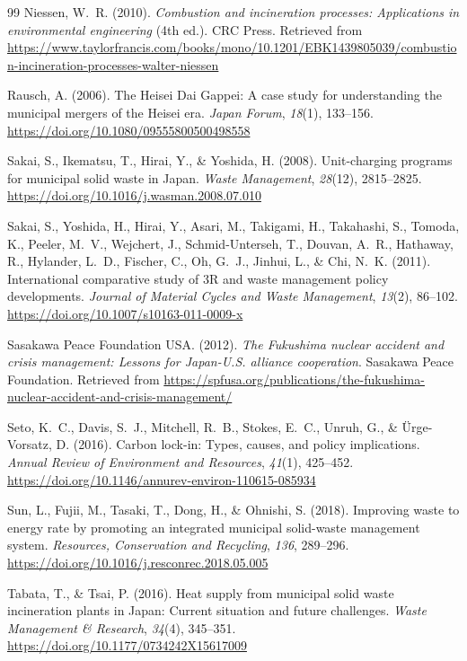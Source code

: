 \documentclass[12pt,a4paper]{article}
\begin{document}
\begin{thebibliography}{99}
Niessen, W.~R. (2010).
\emph{Combustion and incineration processes: Applications in environmental engineering} (4th ed.).
CRC Press.
Retrieved from \url{https://www.taylorfrancis.com/books/mono/10.1201/EBK1439805039/combustion-incineration-processes-walter-niessen}

Rausch, A. (2006).
The Heisei Dai Gappei: A case study for understanding the municipal mergers of the Heisei era.
\emph{Japan Forum}, \emph{18}(1), 133--156.
\url{https://doi.org/10.1080/09555800500498558}

Sakai, S., Ikematsu, T., Hirai, Y., \& Yoshida, H. (2008).
Unit-charging programs for municipal solid waste in Japan.
\emph{Waste Management}, \emph{28}(12), 2815--2825.
\url{https://doi.org/10.1016/j.wasman.2008.07.010}

Sakai, S., Yoshida, H., Hirai, Y., Asari, M., Takigami, H., Takahashi, S., Tomoda, K., Peeler, M.~V., Wejchert, J., Schmid-Unterseh, T., Douvan, A.~R., Hathaway, R., Hylander, L.~D., Fischer, C., Oh, G.~J., Jinhui, L., \& Chi, N.~K. (2011).
International comparative study of 3R and waste management policy developments.
\emph{Journal of Material Cycles and Waste Management}, \emph{13}(2), 86--102.
\url{https://doi.org/10.1007/s10163-011-0009-x}

Sasakawa Peace Foundation USA. (2012).
\emph{The Fukushima nuclear accident and crisis management: Lessons for Japan-U.S. alliance cooperation}.
Sasakawa Peace Foundation.
Retrieved from \url{https://spfusa.org/publications/the-fukushima-nuclear-accident-and-crisis-management/}

Seto, K.~C., Davis, S.~J., Mitchell, R.~B., Stokes, E.~C., Unruh, G., \& {\"U}rge-Vorsatz, D. (2016).
Carbon lock-in: Types, causes, and policy implications.
\emph{Annual Review of Environment and Resources}, \emph{41}(1), 425--452.
\url{https://doi.org/10.1146/annurev-environ-110615-085934}

Sun, L., Fujii, M., Tasaki, T., Dong, H., \& Ohnishi, S. (2018).
Improving waste to energy rate by promoting an integrated municipal solid-waste management system.
\emph{Resources, Conservation and Recycling}, \emph{136}, 289--296.
\url{https://doi.org/10.1016/j.resconrec.2018.05.005}

Tabata, T., \& Tsai, P. (2016).
Heat supply from municipal solid waste incineration plants in Japan: Current situation and future challenges.
\emph{Waste Management \& Research}, \emph{34}(4), 345--351.
\url{https://doi.org/10.1177/0734242X15617009}


\end{thebibliography}
\end{document}

